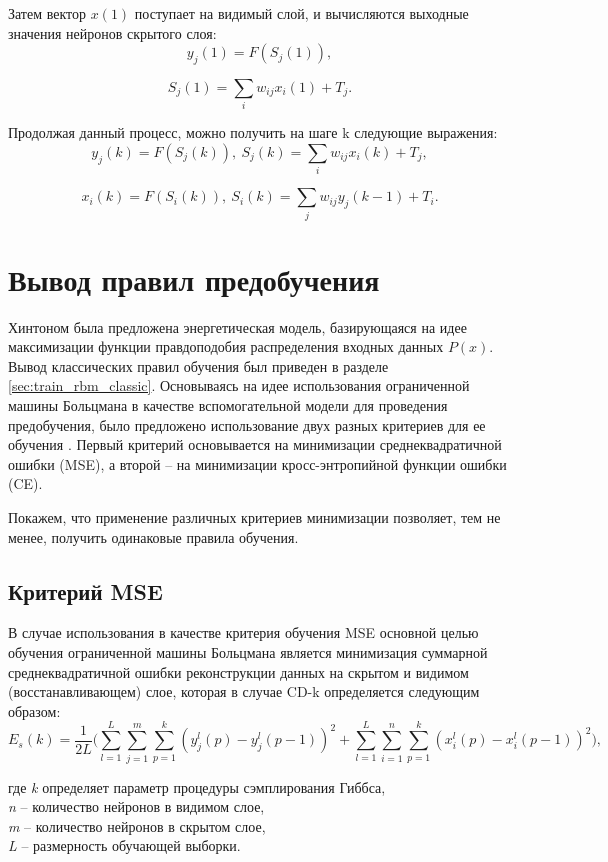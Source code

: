 Затем вектор $x(1)$ поступает на видимый слой, и вычисляются выходные значения нейронов скрытого слоя: 
\begin{equation}
    y_j(1)=F(S_j(1)),
\end{equation}

\begin{equation}
    S_j(1)=\sum_i w_{ij}x_i(1)+T_j.
\end{equation}

Продолжая данный процесс, можно получить на шаге k следующие выражения:
\begin{equation*}		
    y_j(k)=F(S_j(k)),\ S_j(k)=\sum_i w_{ij}x_i(k)+T_j,
\end{equation*}

\begin{equation*}		
    x_i(k)=F(S_i(k)),\ S_i(k)=\sum_j w_{ij}y_j(k-1)+T_i.
\end{equation*}

\section{Вывод правил предобучения} 

Хинтоном была предложена энергетическая модель, базирующаяся на идее максимизации функции правдоподобия распределения входных данных $P(x)$. Вывод классических правил обучения был приведен в разделе \ref{sec:train_rbm_classic}. Основываясь на идее использования ограниченной машины Больцмана в качестве вспомогательной модели для проведения предобучения, было предложено использование двух разных критериев для ее обучения \cite[c.~132-137]{4-A}. Первый критерий основывается на минимизации среднеквадратичной ошибки (MSE), а второй -- на минимизации кросс-энтропийной функции ошибки (CE).

Покажем, что применение различных критериев минимизации позволяет, тем не менее, получить одинаковые правила обучения.

\subsection{Критерий MSE}

В случае использования в качестве критерия обучения MSE основной целью обучения ограниченной машины Больцмана является минимизация суммарной среднеквадратичной ошибки реконструкции данных на скрытом и видимом (восстанавливающем) слое, которая в случае CD-k определяется следующим образом:	
\begin{equation*}	
    E_s(k)=\frac{1}{2L}\Bigg(\sum_{l=1}^L\sum_{j=1}^m\sum_{p=1}^k (y_j^l(p)-y_j^l(p-1))^2+\sum_{l=1}^L\sum_{i=1}^n\sum_{p=1}^k (x_i^l(p)-x_i^l(p-1))^2\Bigg),
\end{equation*}
\begin{tabbing}	
где \=\textit{k} определяет параметр процедуры сэмплирования Гиббса,\\
\>\textit{n} -- количество нейронов в видимом слое,\\
\>\textit{m} -- количество нейронов в скрытом слое,\\
\>\textit{L} -- размерность обучающей выборки.
\end{tabbing}

